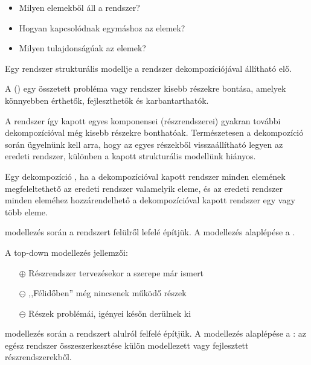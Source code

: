 \begin{itemize}
\item Milyen elemekből áll a rendszer?
\item Hogyan kapcsolódnak egymáshoz az elemek?
\item Milyen tulajdonságúak az elemek?
\end{itemize}

Egy rendszer strukturális modellje a rendszer dekompozíciójával állítható elő.

\begin{definicio}
	A  () egy összetett probléma vagy rendszer kisebb részekre bontása, amelyek könnyebben érthetők, fejleszthetők és karbantarthatók.
\end{definicio}


A rendszer így kapott egyes komponensei (részrendszerei) gyakran további dekompozícióval még kisebb részekre bonthatóak. Természetesen a dekompozíció során ügyelnünk kell arra, hogy az egyes részekből visszaállítható legyen az eredeti rendszer, különben a kapott strukturális modellünk hiányos.

\begin{definicio}
	Egy dekompozíció , ha a dekompozícióval kapott rendszer minden elemének megfeleltethető az eredeti rendszer valamelyik eleme, és az eredeti rendszer minden eleméhez hozzárendelhető a dekompozícióval kapott rendszer egy vagy több eleme.
\end{definicio}

\begin{definicio}
	 modellezés során a rendszert felülről lefelé építjük. A modellezés alaplépése a .
\end{definicio}

A top-down modellezés jellemzői:

\begin{itemize}
\item[$\oplus$] Részrendszer tervezésekor a szerepe már ismert
\item[$\ominus$] ,,Félidőben'' még nincsenek működő részek
\item[$\ominus$] Részek problémái, igényei későn derülnek ki
\end{itemize}

\begin{definicio}
	 modellezés során a rendszert alulról felfelé építjük. A modellezés alaplépése a : az egész rendszer összeszerkesztése külön modellezett vagy fejlesztett részrendszerekből.
\end{definicio}

